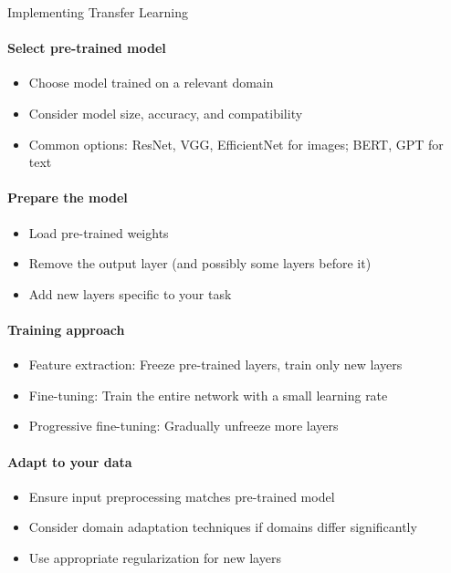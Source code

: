 \begin{KR}{Implementing Transfer Learning}
\paragraph{Select pre-trained model}
\begin{itemize}
    \item Choose model trained on a relevant domain
    \item Consider model size, accuracy, and compatibility
    \item Common options: ResNet, VGG, EfficientNet for images; BERT, GPT for text
\end{itemize}

\paragraph{Prepare the model}
\begin{itemize}
    \item Load pre-trained weights
    \item Remove the output layer (and possibly some layers before it)
    \item Add new layers specific to your task
\end{itemize}

\paragraph{Training approach}
\begin{itemize}
    \item Feature extraction: Freeze pre-trained layers, train only new layers
    \item Fine-tuning: Train the entire network with a small learning rate
    \item Progressive fine-tuning: Gradually unfreeze more layers
\end{itemize}

\paragraph{Adapt to your data}
\begin{itemize}
    \item Ensure input preprocessing matches pre-trained model
    \item Consider domain adaptation techniques if domains differ significantly
    \item Use appropriate regularization for new layers
\end{itemize}
\end{KR}

